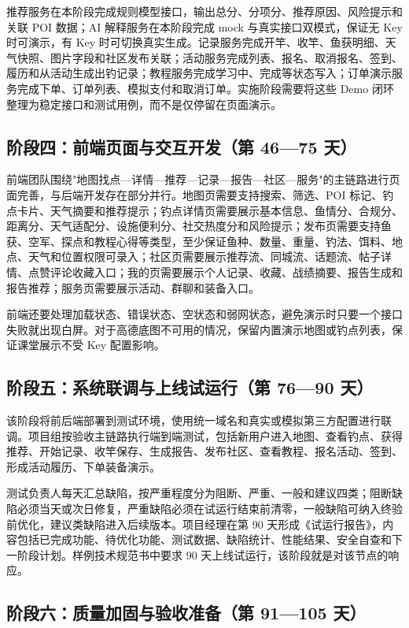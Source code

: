推荐服务在本阶段完成规则模型接口，输出总分、分项分、推荐原因、风险提示和关联 POI 数据；AI 解释服务在本阶段完成 mock 与真实接口双模式，保证无 Key 时可演示，有 Key 时可切换真实生成。记录服务完成开竿、收竿、鱼获明细、天气快照、图片字段和社区发布关联；活动服务完成列表、报名、取消报名、签到、履历和从活动生成出钓记录；教程服务完成学习中、完成等状态写入；订单演示服务完成下单、订单列表、模拟支付和取消订单。实施阶段需要将这些 Demo 闭环整理为稳定接口和测试用例，而不是仅停留在页面演示。

\subsection{阶段四：前端页面与交互开发（第 46—75 天）}

前端团队围绕"地图找点—详情—推荐—记录—报告—社区—服务"的主链路进行页面完善，与后端开发存在部分并行。地图页需要支持搜索、筛选、POI 标记、钓点卡片、天气摘要和推荐提示；钓点详情页需要展示基本信息、鱼情分、合规分、距离分、天气适配分、设施便利分、社交热度分和风险提示；发布页需要支持鱼获、空军、探点和教程心得等类型，至少保证鱼种、数量、重量、钓法、饵料、地点、天气和位置权限可录入；社区页需要展示推荐流、同城流、话题流、帖子详情、点赞评论收藏入口；我的页需要展示个人记录、收藏、战绩摘要、报告生成和报告推荐；服务页需要展示活动、群聊和装备入口。

前端还要处理加载状态、错误状态、空状态和弱网状态，避免演示时只要一个接口失败就出现白屏。对于高德底图不可用的情况，保留内置演示地图或钓点列表，保证课堂展示不受 Key 配置影响。

\subsection{阶段五：系统联调与上线试运行（第 76—90 天）}

该阶段将前后端部署到测试环境，使用统一域名和真实或模拟第三方配置进行联调。项目组按验收主链路执行端到端测试，包括新用户进入地图、查看钓点、获得推荐、开始记录、收竿保存、生成报告、发布社区、查看教程、报名活动、签到、形成活动履历、下单装备演示。

测试负责人每天汇总缺陷，按严重程度分为阻断、严重、一般和建议四类；阻断缺陷必须当天或次日修复，严重缺陷必须在试运行结束前清零，一般缺陷可纳入终验前优化，建议类缺陷进入后续版本。项目经理在第 90 天形成《试运行报告》，内容包括已完成功能、待优化功能、测试数据、缺陷统计、性能结果、安全自查和下一阶段计划。样例技术规范书中要求 90 天上线试运行，该阶段就是对该节点的响应。

\subsection{阶段六：质量加固与验收准备（第 91—105 天）}

